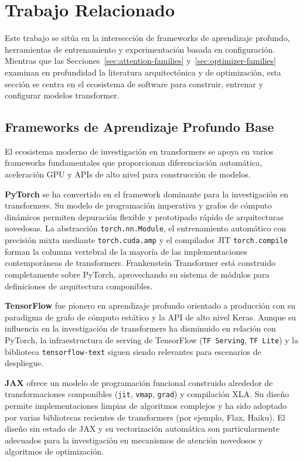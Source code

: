 \section{Trabajo Relacionado}

Este trabajo se sitúa en la intersección de frameworks de aprendizaje profundo, herramientas de entrenamiento y experimentación basada en configuración. Mientras que las Secciones~\ref{sec:attention-families} y~\ref{sec:optimizer-families} examinan en profundidad la literatura arquitectónica y de optimización, esta sección se centra en el ecosistema de software para construir, entrenar y configurar modelos transformer.

\subsection{Frameworks de Aprendizaje Profundo Base}

El ecosistema moderno de investigación en transformers se apoya en varios frameworks fundamentales que proporcionan diferenciación automática, aceleración GPU y APIs de alto nivel para construcción de modelos.

\textbf{PyTorch} \citep{paszke_pytorch_2019} se ha convertido en el framework dominante para la investigación en transformers. Su modelo de programación imperativa y grafos de cómputo dinámicos permiten depuración flexible y prototipado rápido de arquitecturas novedosas. La abstracción \texttt{torch.nn.Module}, el entrenamiento automático con precisión mixta mediante \texttt{torch.cuda.amp} y el compilador JIT \texttt{torch.compile} forman la columna vertebral de la mayoría de las implementaciones contemporáneas de transformers. Frankenstein Transformer está construido completamente sobre PyTorch, aprovechando su sistema de módulos para definiciones de arquitectura componibles.

\textbf{TensorFlow} \citep{abadi_tensorflow_2016} fue pionero en aprendizaje profundo orientado a producción con su paradigma de grafo de cómputo estático y la API de alto nivel Keras. Aunque su influencia en la investigación de transformers ha disminuido en relación con PyTorch, la infraestructura de serving de TensorFlow (\texttt{TF Serving}, \texttt{TF Lite}) y la biblioteca \texttt{tensorflow-text} siguen siendo relevantes para escenarios de despliegue.

\textbf{JAX} \citep{bradbury_jax_2018} ofrece un modelo de programación funcional construido alrededor de transformaciones componibles (\texttt{jit}, \texttt{vmap}, \texttt{grad}) y compilación XLA. Su diseño permite implementaciones limpias de algoritmos complejos y ha sido adoptado por varias bibliotecas recientes de transformers (por ejemplo, Flax, Haiku). El diseño sin estado de JAX y su vectorización automática son particularmente adecuados para la investigación en mecanismos de atención novedosos y algoritmos de optimización.

